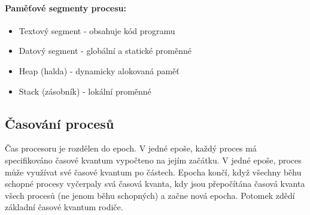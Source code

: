 \paragraph*{Paměťové segmenty procesu:}
\begin{itemize}
    \item Textový segment - obsahuje kód programu
    \item Datový segment - globální a statické proměnné
    \item Heap (halda) - dynamicky alokovaná paměť
    \item Stack (zásobník) - lokální proměnné
\end{itemize}

\subsection{Časování procesů}
Čas procesoru je rozdělen do epoch. V jedné epoše, každý proces má specifikováno
časové kvantum vypočteno na jejím začátku. V jedné epoše, proces může využívat své časové
kvantum po částech. Epocha končí, když všechny běhu schopné
procesy vyčerpaly svá časová kvanta, kdy jsou
přepočítána časová kvanta všech procesů (ne
jenom běhu schopných) a začne nová epocha. Potomek zdědí základní časové kvantum rodiče.

